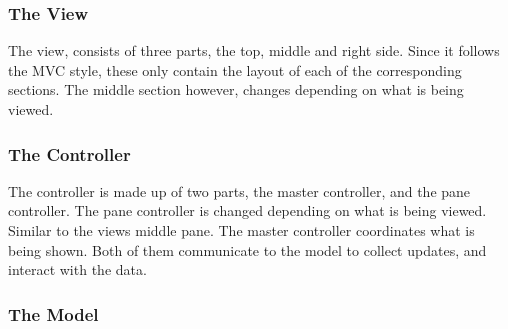 \subsubsection{The View}
\label{subsubsec:the_view}

The view, consists of three parts, the top, middle and right side. Since it follows the MVC style, these only contain the layout of each of the corresponding sections. The middle section however, changes depending on what is being viewed.

\subsubsection{The Controller}
\label{subsubsec:the_controller}

The controller is made up of two parts, the master controller, and the pane controller. The pane controller is changed depending on what is being viewed. Similar to the views middle pane. The master controller coordinates what is being shown. Both of them communicate to the model to collect updates, and interact with the data.

\subsubsection{The Model}
\label{subsubsec:the_model}

